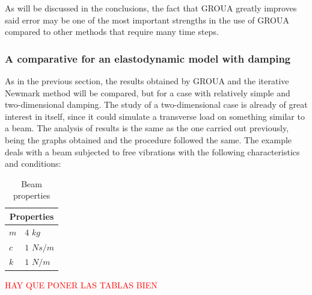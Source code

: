 \documentclass{ws-m3as}
\begin{document}
As will be discussed in the conclusions, the fact that GROUA greatly improves said error may be one of the most important strengths in the use of GROUA compared to other methods that require many time steps.



\subsubsection{A comparative for an elastodynamic model with damping}


As in the previous section, the results obtained by GROUA and the iterative Newmark method will be compared, but for a case with relatively simple and two-dimensional damping. The study of a two-dimensional case is already of great interest in itself, since it could simulate a transverse load on something similar to a beam. The analysis of results is the same as the one carried out previously, being the graphs obtained and the procedure followed the same. The example deals with a beam subjected to free vibrations with the following characteristics and conditions:
 
\begin{table}[htb]
\centering
\caption{Beam properties}
\label{tabla:propiedadesD}
\begin{tabular}{|l|l|}
\hline
\multicolumn{2}{|c|}{Properties} \\ \hline
$m$ & $4$ $kg$ \\
$c$ & $1$ $N s/m$\\
$k$ & $1$ $N/m$\\
\hline
\end{tabular}
\end{table}


\textcolor{Red}{HAY QUE PONER LAS TABLAS BIEN}
\end{document}
